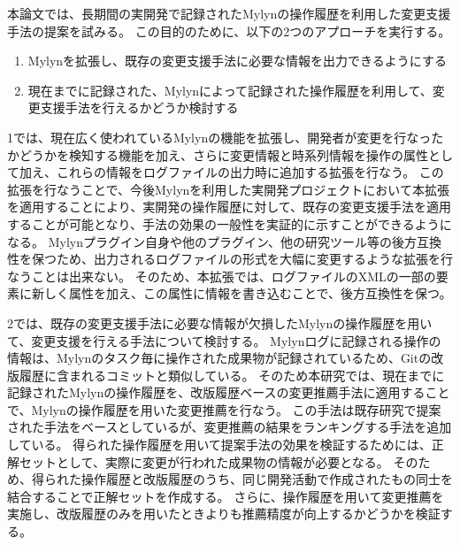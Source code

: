 \documentclass[a4paper]{jsbook}
\begin{document}
本論文では、長期間の実開発で記録されたMylynの操作履歴を利用した変更支援手法の提案を試みる。
この目的のために、以下の2つのアプローチを実行する。
\begin{enumerate}
  \item Mylynを拡張し、既存の変更支援手法に必要な情報を出力できるようにする
  \item 現在までに記録された、Mylynによって記録された操作履歴を利用して、変更支援手法を行えるかどうか検討する
\end{enumerate}

1では、現在広く使われているMylynの機能を拡張し、開発者が変更を行なったかどうかを検知する機能を加え、さらに変更情報と時系列情報を操作の属性として加え、これらの情報をログファイルの出力時に追加する拡張を行なう。
この拡張を行なうことで、今後Mylynを利用した実開発プロジェクトにおいて本拡張を適用することにより、実開発の操作履歴に対して、既存の変更支援手法を適用することが可能となり、手法の効果の一般性を実証的に示すことができるようになる。
Mylynプラグイン自身や他のプラグイン、他の研究ツール等の後方互換性を保つため、出力されるログファイルの形式を大幅に変更するような拡張を行なうことは出来ない。
そのため、本拡張では、ログファイルのXMLの一部の要素に新しく属性を加え、この属性に情報を書き込むことで、後方互換性を保つ。


2では、既存の変更支援手法に必要な情報が欠損したMylynの操作履歴を用いて、変更支援を行える手法について検討する。
Mylynログに記録される操作の情報は、Mylynのタスク毎に操作された成果物が記録されているため、Gitの改版履歴に含まれるコミットと類似している。
そのため本研究では、現在までに記録されたMylynの操作履歴を、改版履歴ベースの変更推薦手法に適用することで、Mylynの操作履歴を用いた変更推薦を行なう。
この手法は既存研究で提案された手法をベースとしているが、変更推薦の結果をランキングする手法を追加している。
得られた操作履歴を用いて提案手法の効果を検証するためには、正解セットとして、実際に変更が行われた成果物の情報が必要となる。
そのため、得られた操作履歴と改版履歴のうち、同じ開発活動で作成されたもの同士を結合することで正解セットを作成する。
さらに、操作履歴を用いて変更推薦を実施し、改版履歴のみを用いたときよりも推薦精度が向上するかどうかを検証する。
\end{document}
